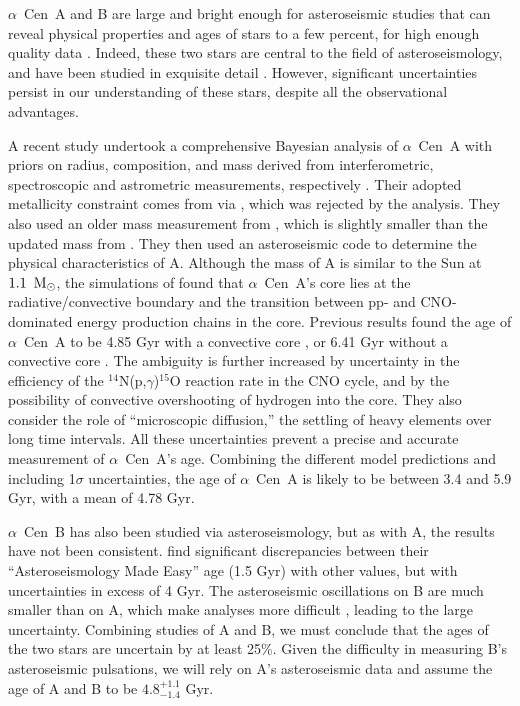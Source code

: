\documentclass[preprint,12pt]{aastex}
\def\msun{{\rm\,M_\odot}}
\def\eg{{\it e.g.\ }}
\def\acen{{$\alpha$~Cen}}
\begin{document}
\acen~A and B are large and bright enough for asteroseismic
studies that can reveal physical properties and ages of stars to a few
percent, for high enough quality data \citep{Chaplin2014}. Indeed, these two stars
are central to the field of asteroseismology, and have been studied in
exquisite detail \citep[e.g.][]{Bouchy01,Bouchy02}. However, significant uncertainties persist in our
understanding of these stars, despite all the observational
advantages.

A recent study undertook a comprehensive Bayesian analysis of \acen~A
with priors on radius, composition, and mass derived from
interferometric, spectroscopic and astrometric measurements,
respectively \citep{Bazot16}. Their adopted metallicity constraint
comes from \cite{NeuforgeMagain97} via \cite{Thoul03}, which was
rejected by the \cite{HinkelKane13} analysis. They also used an older
mass measurement from \cite{Pourbaix02}, which is slightly smaller
than the updated mass from \cite{PourbaixBoffin16}. They then used an
asteroseismic code to determine the physical characteristics of
A. Although the mass of A is similar to the Sun at $1.1~\msun$, the
simulations of \cite{Bazot16} found that \acen~A's core lies at the
radiative/convective boundary and the transition between pp- and
CNO-dominated energy production chains in the core. Previous results
found the age of \acen~A to be 4.85 Gyr with a convective core
\citep{Thevenin02}, or 6.41 Gyr without a convective core
\citep{Thoul03}. The ambiguity is further increased by uncertainty in
the efficiency of the $^{14}$N(p,$\gamma$)$^{15}$O reaction rate in
the CNO cycle, and by the possibility of
convective overshooting of hydrogen into the core. They also consider
the role of ``microscopic diffusion,'' the settling of heavy
elements over long time intervals. All these uncertainties
prevent a precise and accurate measurement of \acen~A's
age. Combining the different model predictions and including 1$\sigma$
uncertainties, the age of \acen~A is likely to be between 3.4 and 5.9 Gyr,
with a mean of 4.78 Gyr.

\acen~B has also been studied via asteroseismology, but as with A, the
results have not been consistent. \cite{Lundkvist14} find significant
discrepancies between their ``Asteroseismology Made Easy'' age (1.5
Gyr) with other values, but with uncertainties in excess of 4 Gyr. The
asteroseismic oscillations on B are much smaller than on A, which make
analyses more difficult \citep[see, \eg,][]{CarrierBourban03},
leading to the large uncertainty. Combining studies of A and B, we
must conclude that the ages of the two stars are uncertain by at least
25\%. Given the difficulty in measuring B's asteroseismic pulsations,
we will rely on A's asteroseismic data and assume the age of A and B
to be $4.8^{+1.1}_{-1.4}$ Gyr.
\end{document}
